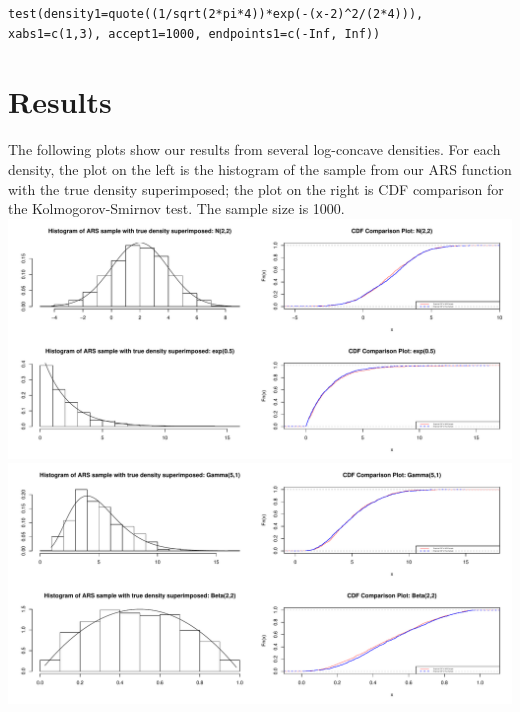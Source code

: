 \documentclass{article}
\begin{document}
\begin{lstlisting}
test(density1=quote((1/sqrt(2*pi*4))*exp(-(x-2)^2/(2*4))), xabs1=c(1,3), accept1=1000, endpoints1=c(-Inf, Inf))
\end{lstlisting}

\section{Results}
The following plots show our results from several log-concave densities. For each density, the plot on the left is the histogram of the sample from our ARS function with the true density superimposed; the plot on the right is  CDF comparison for the Kolmogorov-Smirnov test. The sample size is 1000.\\

\includegraphics[scale=0.45]{plot1.pdf}\\

\includegraphics[scale=0.45]{plot4.pdf}
\end{document}
